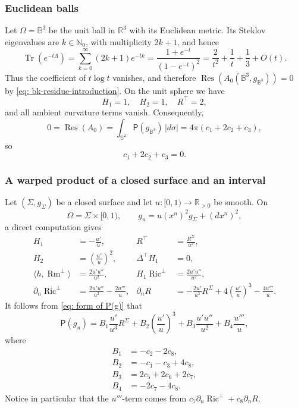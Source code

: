 \documentclass[11pt]{amsart}
\newcommand*{\Res}{\operatorname{Res}}
\newcommand{\Ric}{\operatorname{Ric}}
\newcommand{\Rm}{\operatorname{Rm}}
\newcommand{\Tr}{\operatorname{Tr}}
\theoremstyle{definition}
\numberwithin{equation}{section}
\begin{document}
\subsubsection{Euclidean balls}
Let $\Omega=\mathbb B^3$ be the unit ball in $\mathbb R^3$ with its Euclidean metric.  Its Steklov eigenvalues are $k\in\mathbb N_0$, with multiplicity $2k+1$, and hence
\[
 \Tr(e^{-t\Lambda})=\sum_{k=0}^\infty(2k+1)e^{-tk}
 =\frac{1+e^{-t}}{(1-e^{-t})^2}
 =\frac2{t^2}+\frac1t+\frac13+O(t).
\]
Thus the coefficient of $t\log t$ vanishes, and therefore
$\Res(A_0(\mathbb B^3,g_{\mathbb B^3}))=0$ by  \eqref{eq: bk-residue-introduction}. On the unit sphere we have 
\[H_1=1, \quad   H_2=1, \quad R^\top=2,\] 
and all ambient curvature terms vanish.  Consequently,
\[
 0=\Res(A_0)=\int_{\mathbb S^2}\mathsf P(g_{\mathbb B^3})\,|d\sigma|
 =4\pi(c_1+2c_2+c_3),
\]
so
\begin{equation}\label{eq: c_1-c_8 1}
 c_1+2c_2+c_3=0.
\end{equation}

\subsubsection{A warped product of a closed surface and an interval}
Let $(\Sigma,g_\Sigma)$ be a closed surface and let $u:[0,1)\to\mathbb R_{>0}$ be smooth.  On
\[
 \Omega=\Sigma\times[0,1),\qquad g_u=u(x^n)^2g_\Sigma+(dx^n)^2,
\]
a direct computation gives
\begin{equation}\label{eq: curvatures of g_u}
\begin{aligned}
 H_1&=-\frac{u'}u,
 &R^\top&=\frac{R^\Sigma}{u^2},\\
 H_2&=\left(\frac{u'}u\right)^2,
 &\Delta^\top H_1&=0,\\
 \langle h,\Rm^\bot\rangle&=\frac{2u'u''}{u^2},
 &H_1\Ric^\bot&=\frac{2u'u''}{u^2},\\
 \partial_n\Ric^\bot&=\frac{2u'u''}{u^2}-\frac{2u'''}u,&
 \partial_nR&=-\frac{2u'}{u^3}R^\Sigma
 +4\left(\frac{u'}u\right)^3-\frac{4u'''}u.
\end{aligned}
\end{equation}
It follows from \eqref{eq: form of P(g)} that
\begin{equation}\label{eq: form of P(g) warped product}
 \mathsf P(g_u)
 =B_1\frac{u'}{u^3}R^\Sigma
 +B_2\left(\frac{u'}u\right)^3
 +B_3\frac{u'u''}{u^2}
 +B_4\frac{u'''}u,
\end{equation}
where
\begin{align}
 B_1&=-c_2-2c_8,\label{eq: c_1-c_8 2}\\
 B_2&=-c_1-c_3+4c_8,\label{eq: c_1-c_8 3}\\
 B_3&=2c_5+2c_6+2c_7,\label{eq: c_1-c_8 4}\\
 B_4&=-2c_7-4c_8.\label{eq: c_1-c_8 5}
\end{align}
Notice in particular that the $u'''$-term comes from
$c_7\partial_n\Ric^\bot+c_8\partial_nR$.
\end{document}
